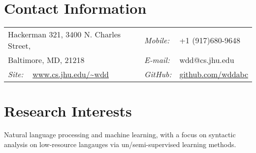 \documentclass[margin,line]{res}
\begin{document}

\begin{resume}
\section{\sc Contact Information}
\vspace{.05in}
\begin{tabular}{@{}p{2.5in}p{0.55in}p{2in}}
Hackerman 321, 3400 N. Charles Street, & {\it Mobile:}& +1 (917)680-9648 \\  
Baltimore, MD, 21218& {\it E-mail:}& wdd@cs.jhu.edu\\
{\it Site:} ~ \url{www.cs.jhu.edu/~wdd}& {\it GitHub:}& \url{github.com/wddabc}\\
\end{tabular}
\section{\sc Research Interests}
Natural language processing and machine learning, with a focus on syntactic analysis
on low-resource langauges via un/semi-supervised learning methods. 


\end{resume}
\end{document}
